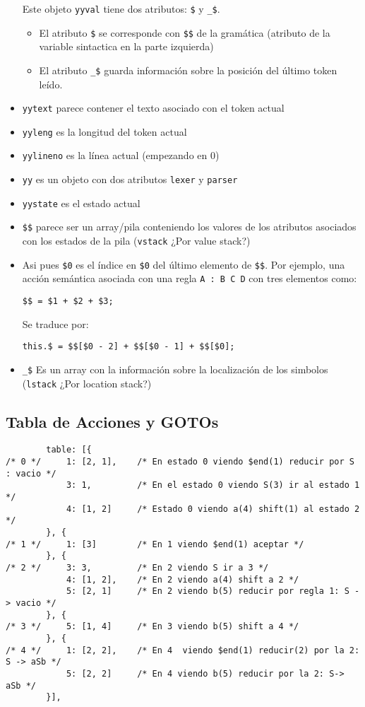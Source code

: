 \begin{itemize}
Este objeto \verb|yyval| tiene dos atributos: \verb|$| y \verb|_$|.
  \begin{itemize}
  \item
  El atributo 
  \verb|$| se corresponde con \verb|$$| de la gramática (atributo de la variable
  sintactica en la parte izquierda)
  \item
  El atributo \verb|_$| guarda información
  sobre la posición del último token leído.
  \end{itemize}
\item
\verb|yytext| parece contener el texto asociado con el token actual
\item
\verb|yyleng| es la longitud del token actual
\item
\verb|yylineno| es la línea actual (empezando en 0)
\item
\verb|yy| es un objeto con dos atributos \verb|lexer| y \verb|parser| 
\item
\verb|yystate| es el estado actual 
\item
\verb|$$| parece ser un array/pila conteniendo 
los valores de los atributos asociados con los estados de la pila (\verb|vstack| ¿Por value stack?)
\item
Asi pues \verb|$0| es el índice en \verb|$0| del último elemento de \verb|$$|.
Por ejemplo, una acción semántica asociada con una regla \verb|A : B C D| con tres elementos como:
\begin{verbatim}
$$ = $1 + $2 + $3;
\end{verbatim}
Se traduce por:
\begin{verbatim}
this.$ = $$[$0 - 2] + $$[$0 - 1] + $$[$0];
\end{verbatim}
\item
\verb|_$|
Es un array con la información sobre la localización de los simbolos (\verb|lstack| ¿Por location stack?)
\end{itemize}

\subsection{Tabla de Acciones y GOTOs}

\begin{verbatim}
        table: [{
/* 0 */     1: [2, 1],    /* En estado 0 viendo $end(1) reducir por S : vacio */
            3: 1,         /* En el estado 0 viendo S(3) ir al estado 1 */
            4: [1, 2]     /* Estado 0 viendo a(4) shift(1) al estado 2 */
        }, {
/* 1 */     1: [3]        /* En 1 viendo $end(1) aceptar */
        }, {
/* 2 */     3: 3,         /* En 2 viendo S ir a 3 */
            4: [1, 2],    /* En 2 viendo a(4) shift a 2 */
            5: [2, 1]     /* En 2 viendo b(5) reducir por regla 1: S -> vacio */
        }, {
/* 3 */     5: [1, 4]     /* En 3 viendo b(5) shift a 4 */
        }, {
/* 4 */     1: [2, 2],    /* En 4  viendo $end(1) reducir(2) por la 2: S -> aSb */
            5: [2, 2]     /* En 4 viendo b(5) reducir por la 2: S-> aSb */
        }],
\end{verbatim}

